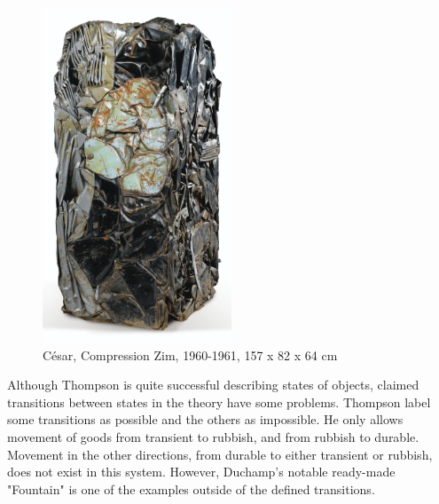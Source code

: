 \begin{figure}[h!]
  \centering
  \includegraphics[height=10cm]{graphics/Cesar_Zim.jpg}
  \caption{César, Compression Zim, 1960-1961, 157 x 82 x 64 cm}
  \label{fig:Cesar_Zim}
\end{figure}

Although Thompson is quite successful describing states of objects, claimed transitions between states in the theory have some problems. Thompson label some transitions as possible and the others as impossible. He only allows movement of goods from transient to rubbish, and from rubbish to durable. Movement in the other directions, from durable to either transient or rubbish, does not exist in this system. However, Duchamp's notable ready-made "Fountain" is one of the examples outside of the defined transitions.

